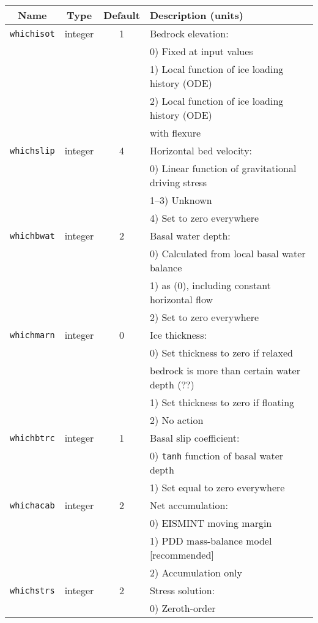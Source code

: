 \documentclass[11pt]{article}
\begin{document}
\begin{center}
\begin{tabular}{|c|c|c|l|}
\hline
Name & Type & Default & Description (units)\\
\hline
\hline
\texttt{whichisot} & integer & 1 & Bedrock elevation: \\
 & & & 0) Fixed at input values \\
 & & & 1) Local function of ice loading history (ODE) \\
 & & & 2) Local function of ice loading history (ODE) \\
 & & & with flexure \\
\hline 
\texttt{whichslip} & integer & 4 & Horizontal bed velocity: \\
 & & & 0) Linear function of gravitational driving stress \\
 & & & 1--3) Unknown \\
 & & & 4) Set to zero everywhere \\
\hline
\texttt{whichbwat} & integer & 2 & Basal water depth: \\
 & & & 0) Calculated from local basal water balance \\
 & & & 1) as (0), including constant horizontal flow \\
 & & & 2) Set to zero everywhere \\
\hline
\texttt{whichmarn} & integer & 0 & Ice thickness: \\
 & & & 0) Set thickness to zero if relaxed \\
 & & & bedrock is more than certain water depth (??) \\
 & & & 1) Set thickness to zero if floating \\
 & & & 2) No action \\
\hline
\texttt{whichbtrc} & integer & 1 & Basal slip coefficient: \\
 & & & 0) \texttt{tanh} function of basal water depth \\
 & & & 1) Set equal to zero everywhere \\
\hline
\texttt{whichacab} & integer & 2 & Net accumulation: \\
 & & & 0) EISMINT moving margin \\
 & & & 1) PDD mass-balance model [recommended] \\
 & & & 2) Accumulation only \\
\hline
\texttt{whichstrs} & integer & 2 & Stress solution: \\
 & & & 0) Zeroth-order \\

\end{tabular}
\end{center}
\end{document}
